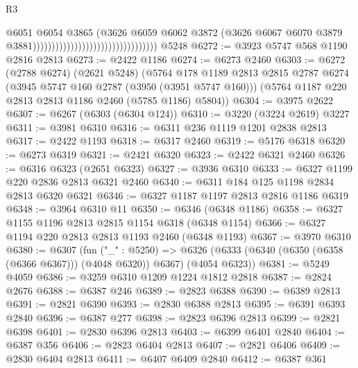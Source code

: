 \begin{lexlean}{R3}
\begin{coremodule}
                                                                  @6051
                                                                  @6054
                                                                  @3865
                                                                  (@3626
                                                                    @6059
                                                                    @6062
                                                                    @3872
                                                                    (@3626
                                                                      @6067
                                                                      @6070
                                                                      @3879
                                                                      @3881)))))))))))))))))))))))))))))))))
    @5248
@6272 := @3923 @5747 @568 @1190 @2816 @2813
@6273 := @2422 @1186
@6274 := @6273 @2460
@6303 := @6272
    (@2788 @6274)
    (@2621 @5248)
    (@5764
      @178
      @1189
      @2813
      @2815
      @2787
      @6274
      (@3945 @5747 @160 @2787 (@3950 (@3951 @5747 @160)))
      (@5764 @1187 @220 @2813 @2813 @1186 @2460 (@5785 @1186) @5804))
@6304 := @3975 @2622
@6307 := @6267 (@6303 (@6304 @124))
@6310 := @3220 (@3224 @2619) @3227
@6311 := @3981 @6310
@6316 := @6311 @236 @1119 @1201 @2838 @2813
@6317 := @2422 @1193
@6318 := @6317 @2460
@6319 := @5176 @6318
@6320 := @6273 @6319
@6321 := @2421 @6320
@6323 := @2422 @6321 @2460
@6326 := @6316 @6323 (@2651 @6323)
@6327 := @3936 @6310
@6333 := @6327 @1199 @220 @2836 @2813 @6321 @2460
@6340 := @6311 @184 @125 @1198 @2834 @2813 @6320 @6321
@6346 := @6327 @1187 @1197 @2813 @2816 @1186 @6319
@6348 := @3964 @6310 @11
@6350 := @6346 (@6348 @1186)
@6358 := @6327 @1155 @1196 @2813 @2815 @1154 @6318 (@6348 @1154)
@6366 := @6327 @1194 @220 @2813 @2813 @1193 @2460 (@6348 @1193)
@6367 := @3970 @6310
@6380 := @6307
    (fun ("_" : @5250) =>
    @6326 (@6333 (@6340 (@6350 (@6358 (@6366 @6367))) (@4048 @6320)) @6367) (@4054 @6323))
@6381 := @5249 @4059
@6386 := @3259 @6310 @1209 @1224 @1812 @2818
@6387 := @2824 @2676
@6388 := @6387 @246
@6389 := @2823 @6388
@6390 := @6389 @2813
@6391 := @2821 @6390
@6393 := @2830 @6388 @2813
@6395 := @6391 @6393 @2840
@6396 := @6387 @277
@6398 := @2823 @6396 @2813
@6399 := @2821 @6398
@6401 := @2830 @6396 @2813
@6403 := @6399 @6401 @2840
@6404 := @6387 @356
@6406 := @2823 @6404 @2813
@6407 := @2821 @6406
@6409 := @2830 @6404 @2813
@6411 := @6407 @6409 @2840
@6412 := @6387 @361

\end{coremodule}
\end{lexlean}
